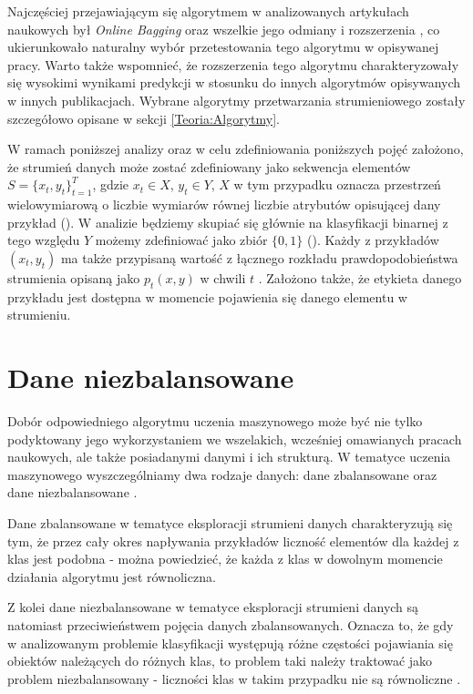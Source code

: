 Najczęściej przejawiającym się algorytmem w analizowanych artykułach naukowych był \textit{Online Bagging} oraz wszelkie jego odmiany i rozszerzenia \cite{Article:TypyPrzykladow}\cite{Article:ManyAlgorithms}\cite{Article:OBFirst}\cite{Article:OBSecond}, co ukierunkowało naturalny wybór przetestowania tego algorytmu w opisywanej pracy. Warto także wspomnieć, że rozszerzenia tego algorytmu charakteryzowały się wysokimi wynikami predykcji w stosunku do innych algorytmów opisywanych w innych publikacjach. Wybrane algorytmy przetwarzania strumieniowego zostały szczegółowo opisane w sekcji \ref{Teoria:Algorytmy}.

W ramach poniższej analizy oraz w celu zdefiniowania poniższych pojęć założono, że strumień danych może zostać zdefiniowany jako sekwencja elementów $S = \{x_t, y_t\}^{T}_{t=1}$, gdzie $x_t \in X$, $y_t \in Y$, $X$ w tym przypadku oznacza przestrzeń wielowymiarową o liczbie wymiarów równej liczbie atrybutów opisującej dany przykład (). W analizie będziemy skupiać się głównie na klasyfikacji binarnej z tego względu $Y$ możemy zdefiniować jako zbiór $\{0,1\}$ (). Każdy z przykładów $(x_t, y_t)$ ma także przypisaną wartość z łącznego rozkładu prawdopodobieństwa strumienia opisaną jako $p_t(x,y)$ w chwili $t$ \cite{Article:TypyPrzykladow}. Założono także, że etykieta danego przykładu jest dostępna w momencie pojawienia się danego elementu w strumieniu.

\section{Dane niezbalansowane}

\noindent Dobór odpowiedniego algorytmu uczenia maszynowego może być nie tylko podyktowany jego wykorzystaniem we wszelakich, wcześniej omawianych pracach naukowych, ale także posiadanymi danymi i ich strukturą. W tematyce uczenia maszynowego wyszczególniamy dwa rodzaje danych: dane zbalansowane oraz dane niezbalansowane \cite{Article:Inz}.

Dane zbalansowane w tematyce eksploracji strumieni danych charakteryzują się tym, że przez cały okres napływania przykładów liczność elementów dla każdej z klas jest podobna - można powiedzieć, że każda z klas w dowolnym momencie działania algorytmu jest równoliczna.

Z kolei dane niezbalansowane w tematyce eksploracji strumieni danych są natomiast przeciwieństwem pojęcia danych zbalansowanych. Oznacza to, że gdy w analizowanym problemie klasyfikacji występują różne częstości pojawiania się obiektów należących do różnych klas, to problem taki należy traktować jako problem niezbalansowany - liczności klas w takim przypadku nie są równoliczne \cite{Article:Inz}.

